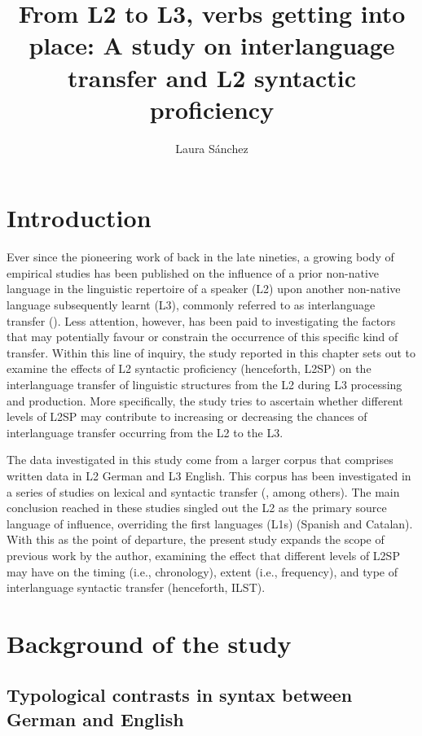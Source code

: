 \documentclass[output=paper,modfonts,nonflat, newtxmath]{langsci/langscibook}
\author{Laura Sánchez\affiliation{Stockholms universitet}}
\title{From L2 to L3, verbs getting into place: A study on interlanguage transfer and L2 syntactic proficiency}
\begin{document}
\maketitle


\section{Introduction}
Ever since the pioneering work of \citet{WilliamsHammarberg1998} back in the late nineties, a growing body of empirical studies has been published on the influence of a prior non-native language in the linguistic repertoire of a speaker (L2) upon another non-native language subsequently learnt (L3), commonly referred to as {interlanguage} {transfer} (\citealt{DeAngelisSelinker2001}). Less attention, however, has been paid to investigating the factors that may potentially favour or constrain the occurrence of this specific kind of transfer. Within this line of inquiry, the study reported in this chapter sets out to examine the effects of L2 syntactic proficiency (henceforth, L2SP) on the interlanguage transfer of linguistic structures from the L2 during L3 processing and production. More specifically, the study tries to ascertain whether different levels of L2SP may contribute to increasing or decreasing the chances of interlanguage transfer occurring from the L2 to the L3.

The data investigated in this study come from a larger corpus that comprises written data in L2 German and L3 English. This corpus has been investigated in a series of studies on lexical \citep{Sánchez2015L2} and syntactic transfer (\citealt{Sánchez2012, Sánchez2015Background}, among others). The main conclusion reached in these studies singled out the L2 as the primary source language of influence, overriding the first languages (L1s) (Spanish and Catalan). With this as the point of departure, the present study expands the scope of previous work by the author, examining the effect that different levels of L2SP may have on the {timing} (i.e., chronology), {extent} (i.e., frequency), and {type} of interlanguage syntactic transfer (henceforth, ILST).

\section{Background of the study}\label{sec:sanchez7:2}

\subsection{Typological contrasts in syntax between German and English}\label{sec:sanchez7:2.1}
\end{document}
